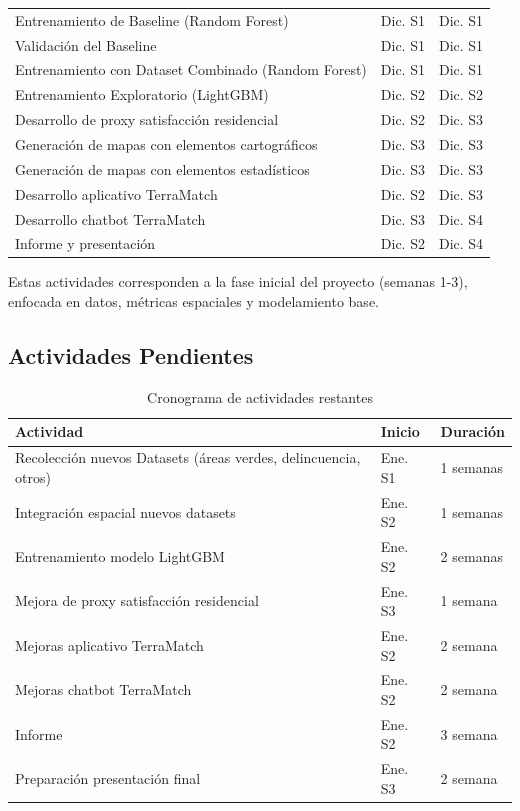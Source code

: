 \documentclass[11pt,letterpaper]{article}
\begin{document}
\begin{table}[H]
\begin{tabular}{@{}lll@{}}
\midrule
Entrenamiento de Baseline (Random Forest) & Dic. S1 & Dic. S1 \\
Validación del Baseline & Dic. S1 & Dic. S1 \\
Entrenamiento con Dataset Combinado (Random Forest) & Dic. S1 & Dic. S1 \\
Entrenamiento Exploratorio (LightGBM) & Dic. S2 & Dic. S2 \\
Desarrollo de proxy satisfacción residencial & Dic. S2 & Dic. S3 \\
Generación de mapas con elementos cartográficos & Dic. S3 & Dic. S3 \\
Generación de mapas con elementos estadísticos & Dic. S3 & Dic. S3 \\
Desarrollo aplicativo TerraMatch & Dic. S2 & Dic. S3 \\
Desarrollo chatbot TerraMatch & Dic. S3 & Dic. S4 \\
Informe y presentación & Dic. S2 & Dic. S4 \\
\bottomrule
\end{tabular}
\end{table}

Estas actividades corresponden a la fase inicial del proyecto (semanas 1-3), enfocada en datos, métricas espaciales y modelamiento base.

\subsection{Actividades Pendientes}

\begin{table}[H]
\centering
\caption{Cronograma de actividades restantes}
\begin{tabular}{@{}lll@{}}
\toprule
\textbf{Actividad}  & \textbf{Inicio} & \textbf{Duración} \\
\midrule
Recolección nuevos Datasets (áreas verdes, delincuencia, otros) & Ene. S1 & 1 semanas \\
Integración espacial nuevos datasets & Ene. S2 & 1 semanas \\
Entrenamiento modelo LightGBM & Ene. S2 & 2 semanas \\
Mejora de proxy satisfacción residencial & Ene. S3 & 1 semana \\
Mejoras aplicativo TerraMatch & Ene. S2 & 2 semana \\
Mejoras chatbot TerraMatch & Ene. S2 & 2 semana \\
Informe & Ene. S2 & 3 semana \\
Preparación presentación final & Ene. S3 & 2 semana \\
\bottomrule
\end{tabular}
\end{table}
\end{document}
